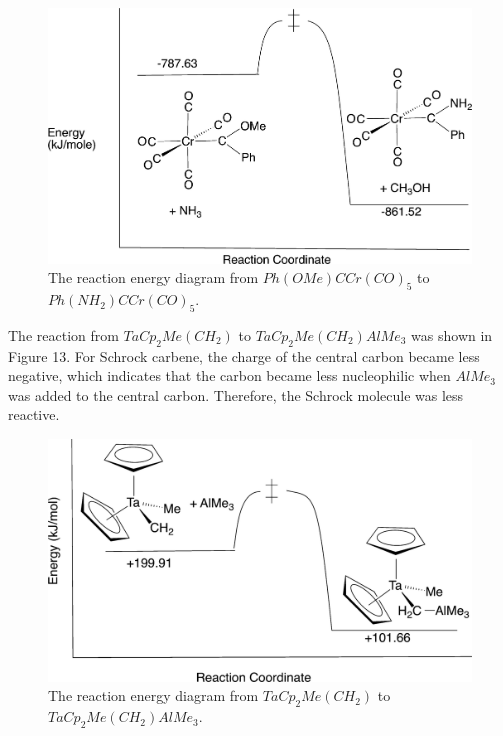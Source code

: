 \documentclass[twocolumn]{article} %
\begin{document}
\begin{figure}[h!]
      \centering
      \includegraphics[width=0.95\columnwidth]{Cr.jpeg} %
      \vspace{2mm} %
      \caption{The reaction energy diagram from $Ph(OMe)CCr(CO)_5$ to $Ph(NH_2)CCr(CO)_5$.\cite{Montgomery}}
\end{figure}

The reaction from $TaCp_2Me(CH_2)$ to $TaCp_2Me(CH_2)AlMe_3$ was shown in Figure 13. For Schrock carbene, the charge of the central carbon became less negative, which indicates that the carbon became less nucleophilic when $AlMe_3$ was added to the central carbon. Therefore, the Schrock molecule was less reactive. 

\begin{figure}[h!]
      \centering
      \includegraphics[width=0.95\columnwidth]{Ta.jpeg} %
      \vspace{2mm} %
      \caption{The reaction energy diagram from $TaCp_2Me(CH_2)$ to $TaCp_2Me(CH_2)AlMe_3$.\cite{Montgomery}}
\end{figure}
\end{document}
